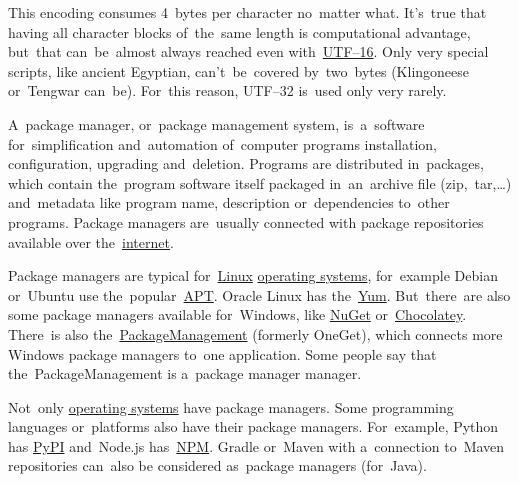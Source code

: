 This encoding consumes 4~bytes per character no~matter what.
It's~true that having all character blocks of~the~same length is computational advantage, but~that can~be~almost always reached even \mbox{with~\hyperref[utf16]{UTF--16}}.
Only very special scripts, like ancient Egyptian, can't~be~covered by~two~bytes (Klingoneese or~Tengwar can~be).
For~this reason, \mbox{UTF--32} is~used only very rarely.

\label{packagemanager}
A~package manager, or~package management system, is~a~software for~simplification and~automation of~computer programs installation, configuration, upgrading and~deletion.
Programs are distributed in~packages, which contain the~program software itself packaged in~an~archive file (zip,~tar,\dots) and~metadata like program name, description or~dependencies to~other programs.
Package managers are~usually connected with package repositories available over the~\hyperref[internetweb]{internet}.

Package managers are typical for~\hyperref[linux]{Linux} \hyperref[os]{operating systems}, for~example Debian or~Ubuntu use the~popular~\hyperref[linuxapt]{APT}.
Oracle Linux has the~\href{http://yum.baseurl.org/}{Yum}.
But~there~are also some package managers available for~Windows, like \href{https://www.nuget.org/}{NuGet} or~\href{https://chocolatey.org/}{Chocolatey}.
There~is also the~\hyperref[windowspackagemanagement]{PackageManagement} (formerly OneGet), which connects more Windows package managers to~one application.
Some people say that the~PackageManagement is a~package manager manager.

Not~only \hyperref[os]{operating systems} have package managers.
Some programming languages or~platforms also have their package managers.
For~example, Python has \href{https://pypi.org/}{PyPI} and~Node.js has~\hyperref[npm]{NPM}.
Gradle or~Maven with a~connection to~Maven repositories can~also be considered as~package managers (for~Java).

